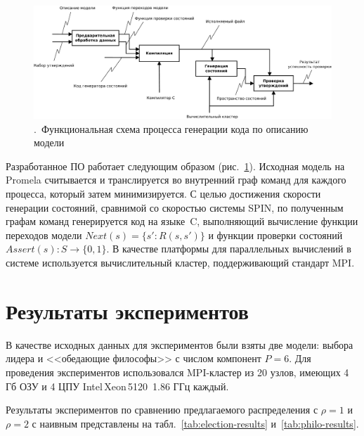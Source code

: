 \documentclass[12pt,a4paper,article]{bpm2}
\begin{document}
\begin{figure}[ht]
  \centering
  \includegraphics[width=\textwidth]{graphics/stategen-idef0-simple.pdf}
  \caption{.~Функциональная схема процесса генерации кода по описанию модели}
  \label{fig:stategen-idef0-simple}
\end{figure}

Разработанное ПО работает следующим образом (рис.~\ref{fig:stategen-idef0-simple}). Исходная модель на Promela считывается и транслируется во внутренний граф команд для каждого процесса, который затем минимизируется.
С целью достижения скорости генерации состояний, сравнимой со скоростью системы SPIN, по полученным графам команд генерируется код на языке~C, выполняющий вычисление функции переходов модели $Next(s) = \{s': R(s, s')\}$ и функции проверки состояний $Assert(s): S \rightarrow \{0, 1\}$.
В качестве платформы для параллельных вычислений в системе используется вычислительный кластер, поддерживающий стандарт MPI.

\section{Результаты экспериментов}
\label{sec:experim}

В качестве исходных данных для экспериментов были взяты две модели: выбора лидера и <<обедающие философы>> с числом компонент $P = 6$.
Для проведения экспериментов использовался MPI-кластер из 20 узлов, имеющих 4 Гб ОЗУ и 4 ЦПУ Intel\,Xeon\,5120~1.86 ГГц каждый.


Результаты экспериментов по сравнению предлагаемого распределения с $\rho = 1$ и $\rho = 2$ с наивным представлены на табл.~\ref{tab:election-results} и~\ref{tab:philo-results}.
\end{document}
